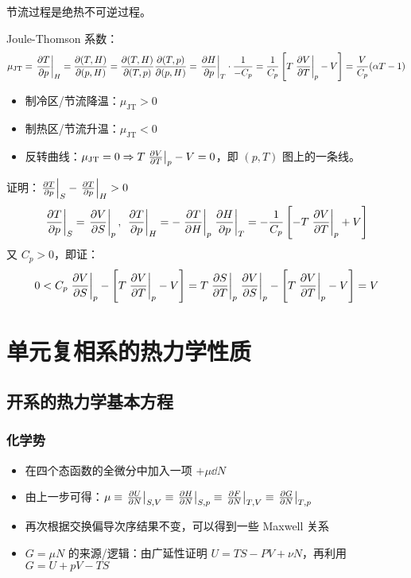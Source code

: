 节流过程是绝热不可逆过程。

Joule-Thomson 系数：
\[
    \mu_{\text{JT}} = \left.\pdv{T}{p}\right|_H = \pdv{(T, H)}{(p, H)} = \pdv{(T, H)}{(T, p)} \pdv{(T, p)}{(p, H)} = \left.\pdv{H}{p}\right|_T \cdot \frac{1}{- C_p} = \frac{1}{C_p} \left[T \left.\pdv{V}{T}\right|_p - V\right] = \frac{V}{C_p} (\alpha T - 1)
\]

\begin{itemize}
    \item 制冷区/节流降温：$\mu_{\text{JT}} > 0$
    \item 制热区/节流升温：$\mu_{\text{JT}} < 0$
    \item 反转曲线：$\mu_{\text{JT}} = 0 \Rightarrow T \left.\pdv{V}{T}\right|_p - V = 0$，即 $(p, T)$ 图上的一条线。
\end{itemize}

\begin{framed}
    证明：$\left.\pdv{T}{p}\right|_S - \left.\pdv{T}{p}\right|_H > 0$
    \[
        \left.\pdv{T}{p}\right|_S = \left.\pdv{V}{S}\right|_p,\ \left.\pdv{T}{p}\right|_H = - \left.\pdv{T}{H}\right|_p \left.\pdv{H}{p}\right|_T = - \frac{1}{C_p} \left[- T \left.\pdv{V}{T}\right|_p + V\right]
    \]
    又 $C_p > 0$，即证：
    \[
        0 < C_p \left.\pdv{V}{S}\right|_p - \left[T \left.\pdv{V}{T}\right|_p - V\right] = T \left.\pdv{S}{T}\right|_p \left.\pdv{V}{S}\right|_p - \left[T \left.\pdv{V}{T}\right|_p - V\right] = V
    \]
\end{framed}

\section{单元复相系的热力学性质}

\subsection{开系的热力学基本方程}

\subsubsection{化学势}
\begin{itemize}
    \item 在四个态函数的全微分中加入一项 $+ \mu \dd{N}$
    \item 由上一步可得：$\mu \equiv \left.\pdv{U}{N}\right|_{S, V} \equiv \left.\pdv{H}{N}\right|_{S, p} \equiv \left.\pdv{F}{N}\right|_{T, V} \equiv \left.\pdv{G}{N}\right|_{T, p}$
    \item 再次根据交换偏导次序结果不变，可以得到一些 Maxwell 关系
    \item $G = \mu N$ 的来源/逻辑：由广延性证明 $U = T S - P V + \nu N$，再利用 $G = U + p V - T S$
\end{itemize}

